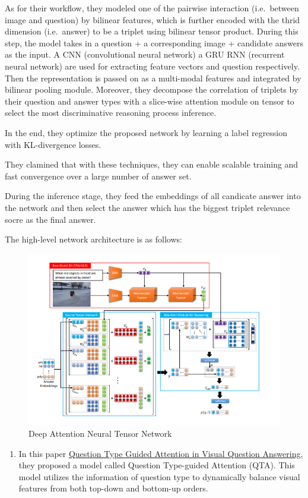 \documentclass[]{book}
\providecommand{\tightlist}{%
  \setlength{\itemsep}{0pt}\setlength{\parskip}{0pt}}
\theoremstyle{definition}
\theoremstyle{definition}
\theoremstyle{definition}
\theoremstyle{remark}
\begin{document}
As for their workflow, they modeled one of the pairwise interaction
(i.e.~between image and question) by bilinear features, which is further
encoded with the thrid dimension (i.e.~answer) to be a triplet using
bilinear tensor product. During this step, the model takes in a question
+ a corresponding image + candidate answers as the input. A CNN
(convolutional neural network) a GRU RNN (recurrent neural network) are
used for extracting feature vectors and question respectively. Then the
representation is passed on as a multi-modal features and integrated by
bilinear pooling module. Moreover, they decompose the correlation of
triplets by their question and answer types with a slice-wise attention
module on tensor to select the most discriminative reasoning process
inference.

In the end, they optimize the proposed network by learning a label
regression with KL-divergence losses.

They clamined that with these techniques, they can enable scalable
training and fast convergence over a large number of answer set.

During the inference stage, they feed the embeddings of all candicate
answer into the network and then select the answer which has the biggest
triplet relevance socre as the final answer.

The high-level network architecture is as follows:

\begin{figure}
\centering
\includegraphics{img/vqa.png}
\caption{Deep Attention Neural Tensor Network}
\end{figure}

\begin{enumerate}
\def\labelenumi{\arabic{enumi}.}
\setcounter{enumi}{1}
\tightlist
\item
  In this paper \href{https://arxiv.org/pdf/1804.02088.pdf}{Question
  Type Guided Attention in Visual Question Answering}, they proposed a
  model called Question Type-guided Attention (QTA). This model utilizes
  the information of question type to dynamically balance visual
  features from both top-down and bottom-up orders.
\end{enumerate}
\end{document}
